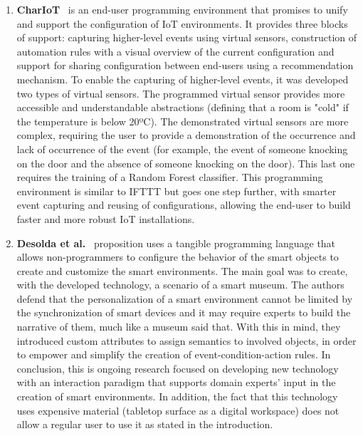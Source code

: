 \begin{enumerate}
    \item \textbf{CharIoT}~\cite{chariot} is an end-user programming environment that promises to unify and support the configuration of IoT environments. It provides three blocks of support: capturing higher-level events using virtual sensors, construction of automation rules with a visual overview of the current configuration and support for sharing configuration between end-users using a recommendation mechanism. To enable the capturing of higher-level events, it was developed two types of virtual sensors. The programmed virtual sensor provides more accessible and understandable abstractions (defining that a room is "cold" if the temperature is below 20ºC). The demonstrated virtual sensors are more complex, requiring the user to provide a demonstration of the occurrence and lack of occurrence of the event (for example, the event of someone knocking on the door and the absence of someone knocking on the door). This last one requires the training of a Random Forest classifier. This programming environment is similar to IFTTT but goes one step further, with smarter event capturing and reusing of configurations, allowing the end-user to build faster and more robust IoT installations.
    \item \textbf{Desolda et al.}~\cite{desolda} proposition uses a tangible programming language that allows non-programmers to configure the behavior of the smart objects to create and customize the smart environments. The main goal was to create, with the developed technology, a scenario of a smart museum. The authors defend that the personalization of a smart environment cannot be limited by the synchronization of smart devices and it may require experts to build the narrative of them, much like a museum said that. With this in mind, they introduced custom attributes to assign semantics to involved objects, in order to empower and simplify the creation of event-condition-action rules. In conclusion, this is ongoing research focused on developing new technology with an interaction paradigm that supports domain experts' input in the creation of smart environments. In addition, the fact that this technology uses expensive material (tabletop surface as a digital workspace) does not allow a regular user to use it as stated in the introduction.

\end{enumerate}
